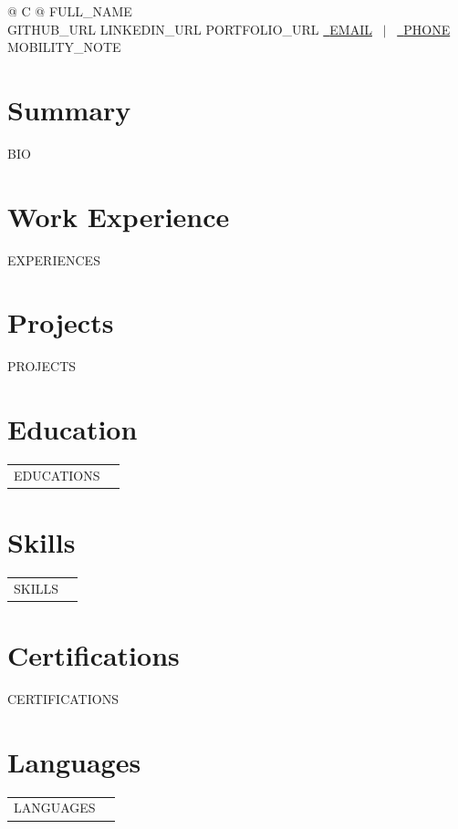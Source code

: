 ﻿\documentclass[a4paper,12pt]{article}
\begin{document}
\pagestyle{empty}

\begin{tabularx}{\linewidth}{@{} C @{}}
\Huge{{{FULL_NAME}}} \\[7.5pt]
{{GITHUB_URL}} {{LINKEDIN_URL}} {{PORTFOLIO_URL}} \href{mailto:{{EMAIL}}}{\raisebox{-0.05\height}\faEnvelope \ {{EMAIL}}} \ $|$ \ \href{tel:{{PHONE}}}{\raisebox{-0.05\height}\faMobile \ {{PHONE}}} \\
{{MOBILITY_NOTE}} \\
\end{tabularx}

\section{Summary}
{{BIO}}

\section{Work Experience}
{{EXPERIENCES}}

\section{Projects}
{{PROJECTS}}

\section{Education}
\begin{tabularx}{\linewidth}{@{}l X@{}}
{{EDUCATIONS}}
\end{tabularx}

\section{Skills}
\begin{tabularx}{\linewidth}{@{}l X@{}}
{{SKILLS}}
\end{tabularx}

\section{Certifications}
{{CERTIFICATIONS}}

\section{Languages}
\begin{tabularx}{\linewidth}{@{}l X@{}}
{{LANGUAGES}}
\end{tabularx}

\vfill
{}
\end{document}
